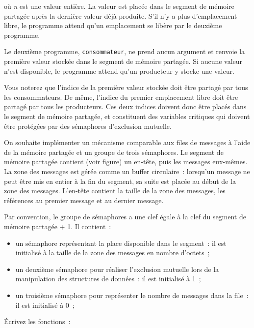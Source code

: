 où \textit {n} est une valeur entière. La valeur est placée dans
le segment de mémoire partagée après la dernière valeur déjà produite.
S'il n'y a plus d'emplacement libre, le programme attend qu'un
emplacement se libère par le deuxième programme.

Le deuxième programme, \texttt {consommateur}, ne prend aucun
argument et renvoie la première valeur stockée dans le segment de
mémoire partagée. Si aucune valeur n'est disponible, le programme
attend qu'un producteur y stocke une valeur.

Vous noterez que l'indice de la première valeur stockée doit être
partagé par tous les consommateurs. De même, l'indice du premier
emplacement libre doit être partagé par tous les producteurs.  Ces
deux indices doivent donc être placés dans le segment de mémoire
partagée, et constituent des variables critiques qui doivent être
protégées par des sémaphores d'exclusion mutuelle.


\question

On souhaite implémenter un mécanisme comparable aux files de messages à
l'aide de la mémoire partagée et un groupe de trois sémaphores.  Le
segment de mémoire partagée contient (voir figure) un en-tête, puis les
messages eux-mêmes.
La zone des messages est gérée comme un buffer circulaire~:  lorsqu'un
message ne peut être mis en entier à la fin du segment, sa suite est
placée au début de la zone des messages.
L'en-tête contient la taille de la zone des messages, les références au
premier message et au dernier message.


Par convention, le groupe de sémaphores a une clef égale à la
clef du segment de mémoire partagée + 1. Il contient~:

\begin {itemize}
    \item un sémaphore représentant la place disponible dans le
	segment~:  il est initialisé à la taille de la zone des messages
	en nombre d'octets~;
    \item un deuxième sémaphore pour réaliser l'exclusion mutuelle lors
	de la manipulation des structures de données~: il est initialisé
	à 1~;
    \item un troisième sémaphore pour représenter le nombre de messages
	dans la file~: il est initialisé à 0~;
\end {itemize}


Écrivez les fonctions~:

